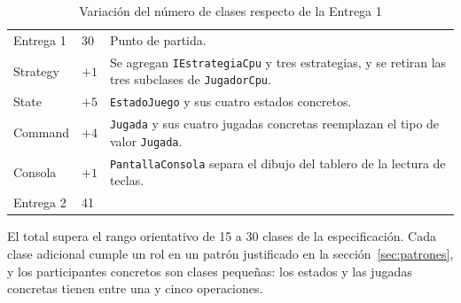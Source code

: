 \begin{table}[H]
\caption{Variación del número de clases respecto de la Entrega 1}\label{tab:tamano}
\tablacompacta
\begin{tabularx}{\textwidth}{@{}L{3.6cm}C{1.6cm}Y@{}}
  \toprule
   &  &  \\ \midrule
  Entrega 1 & 30 & Punto de partida. \\ \filasep
  Strategy & $+1$ & Se agregan \texttt{IEstrategiaCpu} y tres estrategias, y se retiran las tres subclases de \texttt{JugadorCpu}. \\ \filasep
  State & $+5$ & \texttt{EstadoJuego} y sus cuatro estados concretos. \\ \filasep
  Command & $+4$ & \texttt{Jugada} y sus cuatro jugadas concretas reemplazan el tipo de valor \texttt{Jugada}. \\ \filasep
  Consola & $+1$ & \texttt{PantallaConsola} separa el dibujo del tablero de la lectura de teclas. \\ \filasep
  Entrega 2 & 41 & \\
  \bottomrule
\end{tabularx}
\end{table}

El total supera el rango orientativo de 15 a 30 clases de la especificación. Cada clase adicional cumple un rol en un patrón justificado en la sección~\ref{sec:patrones}, y los participantes concretos son clases pequeñas: los estados y las jugadas concretas tienen entre una y cinco operaciones.
